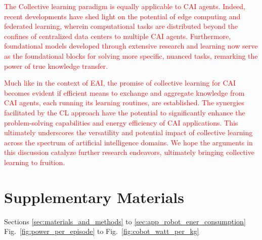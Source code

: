 \documentclass[12pt]{article}
\newcommand\myhl[1]{\textcolor{red}{#1}}
\begin{document}
\myhl{The Collective learning paradigm is equally applicable to CAI agents. Indeed, recent developments have shed light on the potential of edge computing and federated learning, wherein computational tasks are distributed beyond the confines of centralized data centers to multiple CAI agents. Furthermore, foundational models developed through extensive research and learning now serve as the foundational blocks for solving more specific, nuanced tasks, remarking the power of true knowledge transfer.}

\myhl{Much like in the context of EAI, the promise of collective learning for CAI becomes evident if efficient means to exchange and aggregate knowledge from CAI agents, each running its learning routines, are established. The synergies facilitated by the CL approach have the potential to significantly enhance the problem-solving capabilities and energy efficiency of CAI applications. This ultimately underscores the versatility and potential impact of collective learning across the spectrum of artificial intelligence domains. We hope the arguments in this discussion catalyze further research endeavors, ultimately bringing collective learning to fruition.}

\section*{Supplementary Materials}
Sections \ref{sec:materials_and_methods} to \ref{sec:app_robot_ener_consumption}\\
Fig.~\ref{fig:power_per_episode} to Fig.~\ref{fig:cobot_watt_per_kg}

\renewcommand\refname{References and Notes}


\end{document}
